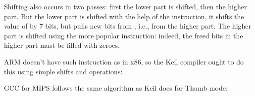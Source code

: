 ﻿









Shifting also occurs in two passes: first the lower part is shifted, then the higher part.
But the lower part is shifted with the help of the  instruction, it shifts the value of \EDX{} by 7 bits, but pulls new bits
from \EAX{}, i.e., from the higher part.
The higher part is shifted using the more popular \SHR{} instruction: indeed, the freed bits in the higher part
must be filled with zeroes.


ARM doesn't have such instruction as  in x86, so the Keil compiler ought to do this using simple shifts and  operations:






GCC for MIPS follows the same algorithm as Keil does for Thumb mode:




